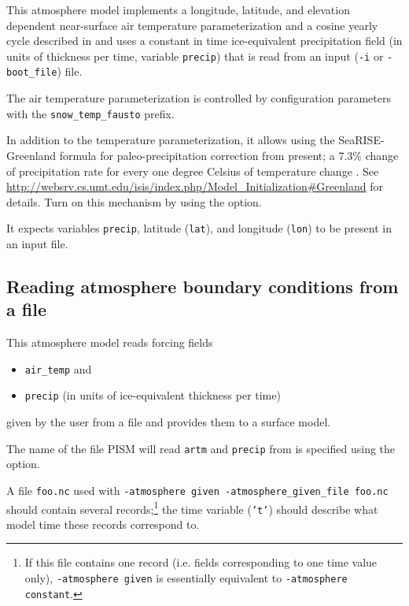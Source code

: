 \documentclass[titlepage,letterpaper,final]{scrartcl}
\begin{document}
This atmosphere model implements a longitude, latitude, and elevation dependent near-surface air temperature parameterization and a cosine yearly cycle described in \cite{Faustoetal2009} and uses a constant in time ice-equivalent precipitation field (in units of thickness per time, variable \texttt{precip}) that is read from an input (\texttt{-i} or \texttt{-boot_file}) file.

The air temperature parameterization is controlled by configuration parameters with the \texttt{snow_temp_fausto} prefix.

In addition to the temperature parameterization, it allows using the SeaRISE-Greenland formula for paleo-precipitation correction from present; a 7.3\% change of precipitation rate for every one degree Celsius of temperature change \cite{Huybrechts02}.  See \url{http://websrv.cs.umt.edu/isis/index.php/Model_Initialization#Greenland} for details.  Turn on this mechanism by using the  option.

It expects variables \texttt{precip}, latitude (\texttt{lat}), and longitude (\texttt{lon}) to be present in an input file.

\subsection{Reading atmosphere boundary conditions from a file}
\label{sec:atmosphere-given}

This atmosphere model reads forcing fields
\begin{itemize}
\item \texttt{air_temp} and
\item \texttt{precip} (in units of ice-equivalent thickness per time)
\end{itemize}
given by the user from a file and provides them to a surface model.

The name of the file PISM will read \texttt{artm} and \texttt{precip} from is specified using the  option.

A file \texttt{foo.nc} used with \texttt{-atmosphere given -atmosphere_given_file foo.nc} should contain several records;\footnote{If this file contains one record (i.e. fields corresponding to one time value only), \texttt{-atmosphere given} is essentially equivalent to \texttt{-atmosphere constant}.} the time variable (\texttt{'t'}) should describe what model time these records correspond to.
\end{document}
